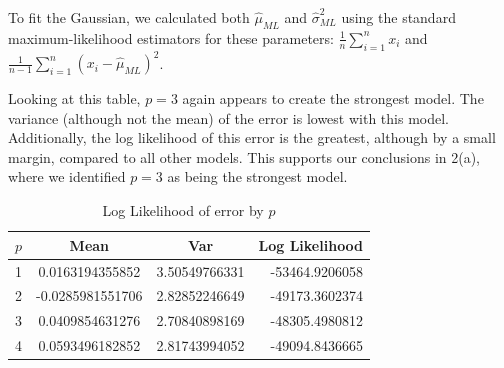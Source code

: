 \documentclass[11pt]{article}
\begin{document}
\begin{enumerate}
To fit the Gaussian, we calculated both $\hat \mu_{ML}$ and $\hat \sigma^2_{ML}$ using the standard maximum-likelihood estimators for these parameters: $\frac{1}{n} \sum_{i=1}^{n} x_i$ and $\frac{1}{n-1} \sum_{i=1}^{n} (x_i - \hat \mu_{ML})^2$.

Looking at this table, $p = 3$ again appears to create the strongest model. The variance (although not the mean) of the error is lowest with this model. Additionally, the log likelihood of this error is the greatest, although by a small margin, compared to all other models. This supports our conclusions in 2(a), where we identified $p = 3$ as being the strongest model.

\begin{table}[!th]
\centering
\begin{tabular}{| l| c | c | r|}
\hline
$p$ & Mean & Var & Log Likelihood \\
\hline
1 & 0.0163194355852 & 3.50549766331 & -53464.9206058 \\
2 & -0.0285981551706 & 2.82852246649 & -49173.3602374 \\
3 & 0.0409854631276 & 2.70840898169 & -48305.4980812 \\
4 & 0.0593496182852 & 2.81743994052 & -49094.8436665 \\
\hline
\end{tabular}
\caption{Log Likelihood of error by $p$}
\label{ex:table}
\end{table}

\end{enumerate}
\end{document}
